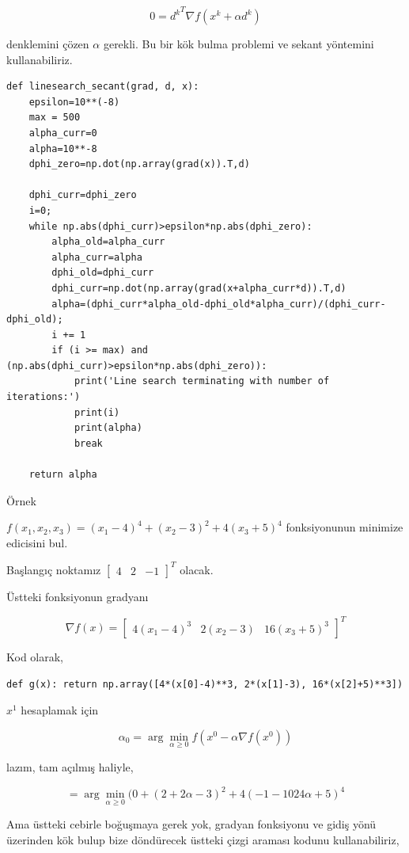 \documentclass[12pt,fleqn]{article}\usepackage{../../common}
\begin{document}
$$
0 = {d^k}^T \nabla f(x^k + \alpha d^k) 
$$

denklemini çözen $\alpha$ gerekli. Bu bir kök bulma problemi ve sekant
yöntemini kullanabiliriz. 

\begin{verbatim}
def linesearch_secant(grad, d, x):
    epsilon=10**(-8)
    max = 500
    alpha_curr=0
    alpha=10**-8
    dphi_zero=np.dot(np.array(grad(x)).T,d)

    dphi_curr=dphi_zero
    i=0;
    while np.abs(dphi_curr)>epsilon*np.abs(dphi_zero):
        alpha_old=alpha_curr
        alpha_curr=alpha
        dphi_old=dphi_curr        
        dphi_curr=np.dot(np.array(grad(x+alpha_curr*d)).T,d)
        alpha=(dphi_curr*alpha_old-dphi_old*alpha_curr)/(dphi_curr-dphi_old);
        i += 1
        if (i >= max) and (np.abs(dphi_curr)>epsilon*np.abs(dphi_zero)):
            print('Line search terminating with number of iterations:')
            print(i)
            print(alpha)
            break
        
    return alpha
\end{verbatim}

Örnek

$f(x_1,x_2,x_3) = (x_1 - 4)^4 + (x_2 - 3)^2 + 4(x_3 + 5)^4$ fonksiyonunun
minimize edicisini bul.

Başlangıç noktamız $\left[\begin{array}{ccc} 4 & 2 & -1 \end{array}\right]^T$
olacak. 

Üstteki fonksiyonun gradyanı

$$
\nabla f(x) = \left[\begin{array}{ccc}  
4(x_1-4)^3 & 2(x_2-3) & 16(x_3+5)^3
\end{array}\right]^T
$$

Kod olarak,

\begin{verbatim}
def g(x): return np.array([4*(x[0]-4)**3, 2*(x[1]-3), 16*(x[2]+5)**3])
\end{verbatim}

$x^1$ hesaplamak için 

$$
\alpha_0 = \arg\min_{\alpha \ge 0} f(x^0 - \alpha \nabla f(x^0))
$$

lazım, tam açılmış haliyle, 

$$
= \arg\min_{\alpha \ge 0} (0 + (2+2\alpha-3)^2 + 4(-1-1024\alpha+5)^4
$$

Ama üstteki cebirle boğuşmaya gerek yok, gradyan fonksiyonu ve gidiş yönü
üzerinden kök bulup bize döndürecek üstteki çizgi araması kodunu
kullanabiliriz,
\end{document}

